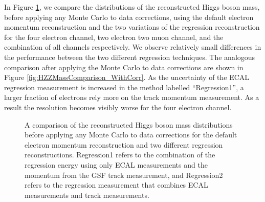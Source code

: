 \documentclass{cmspaper}
\begin{document}
In Figure \ref{fig:HZZMassComparison_NoCorr}, we compare the distributions of the reconstructed
Higgs boson mass, before applying any Monte Carlo to data corrections, 
using the default electron momentum reconstruction and the two variations of the
regression reconstruction for the four electron channel, two electron two muon channel, and 
the combination of all channels respectively. We observe relatively small differences in the performance
between the two different regression techniques. The analogous comparison after applying the 
Monte Carlo to data corrections are shown in Figure \ref{fig:HZZMassComparison_WithCorr}.
As the uncertainty of the ECAL regression measurement is increased in the method labelled
``Regression1'', a larger fraction of electrons rely more on the track momentum measurement. As a 
result the resolution becomes visibly worse for the four electron channel. 
 
\begin{figure}[h]
\centering
	\caption{ A comparison of the reconstructed Higgs boson mass distributions before applying any Monte Carlo
          to data corrections for the default electron momentum reconstruction and two different regression reconstructions.
        Regression1 refers to the combination of the regression energy using only ECAL measurements and the
        momentum from the GSF track measurement, and Regression2 refers to the regression measurement that 
        combines ECAL measurements and track measurements.}
	\label{fig:HZZMassComparison_NoCorr}
\end{figure}
\end{document}
